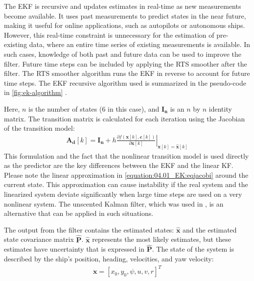 The EKF is recursive and updates estimates in real-time as new measurements become available. It uses past measurements to predict states in the near future, making it useful for online applications, such as autopilots or autonomous ships. However, this real-time constraint is unnecessary for the estimation of pre-existing data, where an entire time series of existing measurements is available. In such cases, knowledge of both past and future data can be used to improve the filter. Future time steps can be included by applying the RTS smoother after the filter. The RTS smoother algorithm runs the EKF in reverse to account for future time steps. The EKF recursive algorithm used is summarized in the pseudo-code in \autoref{fig:ek-algorithm} \cite{brownIntroductionRandomSignals1997}.
\clearpage

\noindent Here, \(n\) is the number of states (6 in this case), and \(\mathbf{I_n}\) is an $n$ by $n$ identity matrix.
The transition matrix is calculated for each iteration using the Jacobian of the transition model:
\begin{equation}\label{equation:04.01_EK:eqjacobi}
\begin{split}\mathbf{A_d}[k] = \mathbf{I_n} + h \left. \frac{\partial f \left(\mathbf{x}[k],\mathbf{c}[k] \right)}{\partial \mathbf{x}[k]} \right|_{\mathbf{x}[k]=\mathbf{\hat{x}}[k]}\end{split}
\end{equation}
This formulation and the fact that the nonlinear transition model is used directly as the predictor are the key differences between the EKF and the linear KF. Please note the linear approximation in \autoref{equation:04.01_EK:eqjacobi} around the current state. This approximation can cause instability if the real system and the linearized system deviate significantly when large time steps are used on a very nonlinear system. The unscented Kalman filter, which was used in \textcite{revestidoherreroTwostepIdentificationNonlinear2012}, is an alternative that can be applied in such situations.

The output from the filter contains the estimated states: \(\mathbf{\hat{x}}\) and the estimated state covariance matrix \(\mathbf{\hat{P}}\). \(\mathbf{\hat{x}}\) represents the most likely estimates, but these estimates have uncertainty that is expressed in \(\mathbf{\hat{P}}\).
The state of the system is described by the ship's position, heading, velocities, and yaw velocity:
\begin{equation}\label{equation:04.01_EK:eqstates}
\begin{split}\mathbf{x} = [x_0,y_0,\psi,u,v,r]^T\end{split}
\end{equation}

